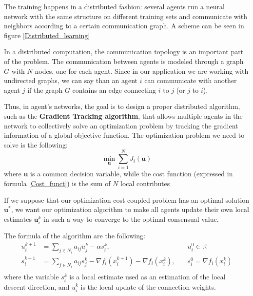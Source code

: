 \documentclass[a4paper,11pt,oneside]{book}
\begin{document}
The training happens in a distributed fashion: several agents run a neural network with the same structure on different training sets and communicate with neighbors according to a certain communication graph. A scheme can be seen in figure \ref{Distributed_learning}

\bigskip
In a distributed computation, the communication topology is an important part of the problem. The communication between agents is modeled through a graph $G$ with $N$ nodes, one for each agent. Since in our application we are working with undirected graphs, we can say than an agent $i$ can communicate with another agent $j$ if the graph $G$ contains an edge connecting $i$ to $j$ (or $j$ to $i$).

\bigskip
Thus, in agent's networks, the goal is to design a proper distributed algorithm, such as the \textbf{Gradient Tracking algorithm}, that allows multiple agents in the network to collectively solve an optimization problem by tracking the gradient information of a global objective function.
The optimization problem we need to solve is the following:
\begin{equation}
\min_{\textbf{u}} \sum_{i=1}^N J_i(\textbf{u})
\end{equation}
where $\textbf{u}$ is a common decision variable, while the cost function (expressed in formula \ref{Cost_funct}) is the sum of $N$ local contributes

\bigskip
If we suppose that our optimization cost coupled problem has an optimal solution $\textbf{u}^*$, we want our optimization algorithm to make all agents update their own local estimates $\textbf{u}_i^k$ in such a way to converge to the optimal consensual value.

The formula of the algorithm are the following:
\begin {equation}
\begin{aligned}
u_i^{k+1} &= \sum_{j \in N_i} a_{ij} u_j^k - \alpha s_i^k, \quad & u_i^0 \in \mathbb{R}\\
s_i^{k+1}   &= \sum_{j \in N_i} a_{ij} s_j^k - \nabla f_i(x_i^{k+1}) - \nabla f_i(x_i^k) , \quad & s_i^0 = \nabla f_i(x_i^k) \\
\end{aligned}
\end{equation}
where the variable $s_i^k$ is a local estimate used as an estimation of the local descent direction, and $u_i^k$ is the local update of the connection weights. 
\end{document}
